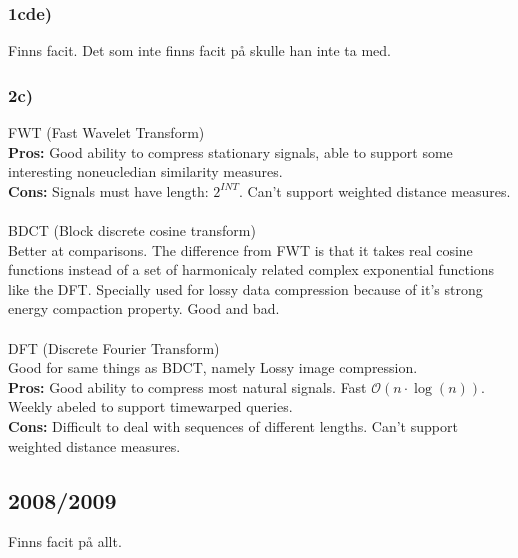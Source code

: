 \documentclass[12pt]{article}
\begin{document}
    \subsubsection*{1cde)}
    
        Finns facit. Det som inte finns facit på skulle han inte ta med.
        
    \subsubsection*{2c)}
    
        FWT (Fast Wavelet Transform)\\
        \textbf{Pros:} Good ability to compress stationary signals, able to support some interesting noneucledian similarity measures.\\ 
        \textbf{Cons:} Signals must have length: $2^{INT}$. Can't support weighted distance measures.\\
        \\
        BDCT (Block discrete cosine transform)\\
        Better at comparisons. The difference from FWT is that it takes real cosine functions instead of a set of harmonicaly related complex
        exponential functions like the DFT. Specially used for lossy data compression because of it's strong energy compaction property. 
        Good and bad.\\
        \\
        DFT (Discrete Fourier Transform)\\
        Good for same things as BDCT, namely Lossy image compression.\\
        \textbf{Pros:} Good ability to compress most natural signals. Fast $\mathcal{O}(n \cdot \log(n))$. 
        Weekly abeled to support timewarped queries. \\
        \textbf{Cons:} Difficult to deal with sequences of different lengths. Can't support weighted distance measures.
        
\subsection*{2008/2009}

    Finns facit på allt.
\end{document}
